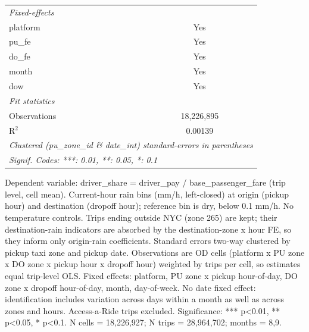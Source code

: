 \begin{tabular}{lc}
   \midrule
   \emph{Fixed-effects}\\
   platform                                      & Yes\\  
   pu\_fe                                        & Yes\\  
   do\_fe                                        & Yes\\  
   month                                         & Yes\\  
   dow                                           & Yes\\  
   \midrule
   \emph{Fit statistics}\\
   Observations                                  & 18,226,895\\  
   R$^2$                                         & 0.00139\\  
   \midrule \midrule
   \multicolumn{2}{l}{\emph{Clustered (pu\_zone\_id \& date\_int) standard-errors in parentheses}}\\
   \multicolumn{2}{l}{\emph{Signif. Codes: ***: 0.01, **: 0.05, *: 0.1}}\\
\end{tabular}
 
\par \raggedright 
Dependent variable: driver\_share = driver\_pay / base\_passenger\_fare (trip level, cell mean). Current-hour rain bins (mm/h, left-closed) at origin (pickup hour) and destination (dropoff hour); reference bin is dry, below 0.1 mm/h. No temperature controls. Trips ending outside NYC (zone 265) are kept; their destination-rain indicators are absorbed by the destination-zone x hour FE, so they inform only origin-rain coefficients. Standard errors two-way clustered by pickup taxi zone and pickup date. Observations are OD cells (platform x PU zone x DO zone x pickup hour x dropoff hour) weighted by trips per cell, so estimates equal trip-level OLS. Fixed effects: platform, PU zone x pickup hour-of-day, DO zone x dropoff hour-of-day, month, day-of-week. No date fixed effect: identification includes variation across days within a month as well as across zones and hours. Access-a-Ride trips excluded. Significance: *** p<0.01, ** p<0.05, * p<0.1. N cells = 18,226,927; N trips = 28,964,702; months = 8,9.
\par\endgroup


\ifdefined\ifclassloaded
{}
\fi
